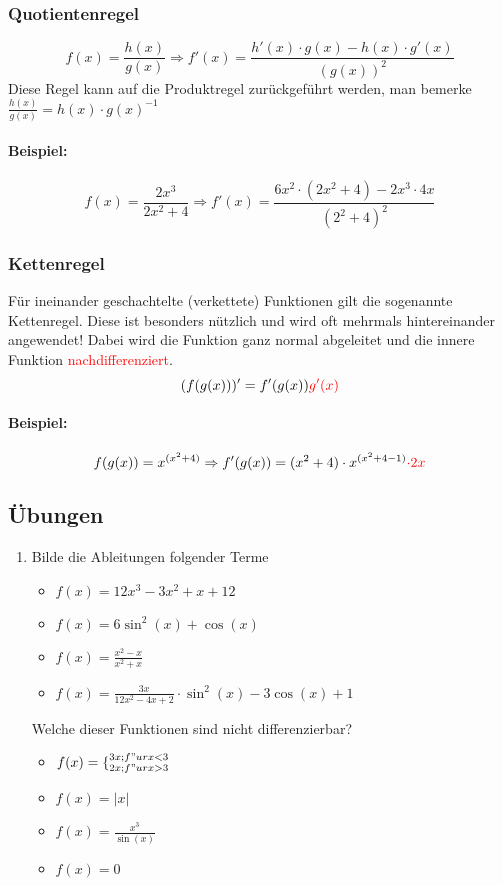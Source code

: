 \subsubsection{Quotientenregel}
\begin{equation*}
f(x)=\frac{h(x)}{g(x)} \Rightarrow f'(x)=\frac{h'(x) \cdot g(x)-h(x) \cdot g'(x)}{(g(x))^2}
\end{equation*}
Diese Regel kann auf die Produktregel zurückgeführt werden, man bemerke $\frac{h(x)}{g(x)} = h(x) \cdot g(x)^{-1}$

\paragraph{Beispiel:}
\begin{equation*}
f(x)=\frac{2x^3}{2x^2+4} \Rightarrow f'(x)=\frac{6x^2 \cdot (2x^2+4)-2x^3 \cdot 4x}{(2^2+4)^2}
\end{equation*}

\subsubsection{Kettenregel}
Für ineinander geschachtelte (verkettete) Funktionen gilt die sogenannte Kettenregel. Diese ist besonders nützlich und wird oft mehrmals hintereinander angewendet! Dabei wird die Funktion ganz normal abgeleitet und die innere Funktion \textcolor{red}{nachdifferenziert}.
\begin{equation*}
( f(g(x)) )'=f'(g(x))\textcolor{red}{g'(x)}
\end{equation*}

\paragraph{Beispiel:}
\begin{equation*}
f(g(x))=x^{(x^2+4)}\Rightarrow f'(g(x))=(x^2+4)\cdot x^{(x^2+4-1)}\textcolor{red}{ \cdot 2x}
\end{equation*}

\subsection{Übungen}
\begin{enumerate}
\item Bilde die Ableitungen folgender Terme
\begin{itemize}
\item $f(x)=12x^3 - 3x^2 + x + 12$
\item $f(x)= 6 \sin^2(x) + \cos(x) $
\item $f(x)= \frac{x^2-x}{x^2+x}$
\item $f(x)= \frac{3x}{12x^2 - 4x + 2} \cdot \sin^2(x) - 3 \cos(x) + 1$
\end{itemize}
Welche dieser Funktionen sind nicht differenzierbar?
\begin{itemize}
\item $f(x)=\lbrace^{3x; f"ur x < 3}_{2x; f"ur x>3}$
\item $f(x)=|x|$
\item $f(x)= \frac{x^3}{\sin(x)}$
\item $f(x)= 0$
\end{itemize}
\end{enumerate}